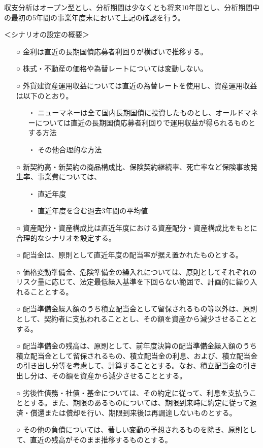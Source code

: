\documentclass[report,gutter=10mm,fore-edge=10mm,uplatex,dvipdfmx]{jlreq}
\begin{document}
収支分析はオープン型とし、分析期間は少なくとも将来10年間とし、分析期間中の最初の5年間の事業年度末において上記の確認を行う。

＜シナリオの設定の概要＞

\begin{itemize}
\item[○] 金利は直近の長期国債応募者利回りが横ばいで推移する。
\item[○] 株式・不動産の価格や為替レートについては変動しない。
\item[○] 外貨建資産運用収益については直近の為替レートを使用し、資産運用収益は以下のとおり。
\begin{itemize}
\item[・] ニューマネーは全て国内長期国債に投資したものとし、オールドマネーについては直近の長期国債応募者利回りで運用収益が得られるものとする方法
\item[・] その他合理的な方法
\end{itemize}
\item[○] 新契約高・新契約の商品構成比、保険契約継続率、死亡率など保険事故発生率、事業費については、
\begin{itemize}
\item[・] 直近年度
\item[・] 直近年度を含む過去3年間の平均値
\end{itemize}
\item[○] 資産配分・資産構成比は直近年度における資産配分・資産構成比をもとに合理的なシナリオを設定する。
\item[○] 配当金は、原則として直近年度の配当率が据え置かれたものとする。
\item[○] 価格変動準備金、危険準備金の繰入れについては、原則としてそれぞれのリスク量に応じて、法定最低繰入基準を下回らない範囲で、計画的に繰り入れることとする。
\item[○] 配当準備金繰入額のうち積立配当金として留保されるもの等以外は、原則として、契約者に支払われることとし、その額を資産から減少させることとする。
\item[○] 配当準備金の残高は、原則として、前年度決算の配当準備金繰入額のうち積立配当金として留保されるもの、積立配当金の利息、および、積立配当金の引き出し分等を考慮して、計算することとする。なお、積立配当金の引き出し分は、その額を資産から減少させることとする。
\item[○] 劣後性債務・社債・基金については、その約定に従って、利息を支払うこととする。また、期限のあるものについては、期限到来時に約定に従って返済・償還または償却を行い、期限到来後は再調達しないものとする。
\item[○] その他の負債については、著しい変動の予想されるものを除き、原則として、直近の残高がそのまま推移するものとする。
\end{itemize}
\end{document}
